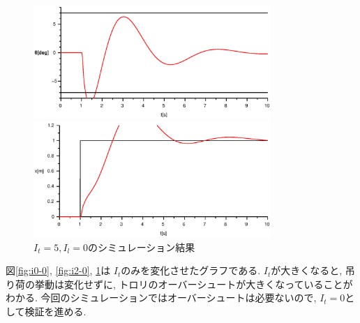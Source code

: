 \documentclass[titlepage]{jsarticle}
\begin{document}
            \begin{figure}[h]
                \begin{minipage}{0.5\hsize}
                    \centering
                    \includegraphics[width=9cm]{img/I5-0t.eps}
                \end{minipage}
                \begin{minipage}{0.5\hsize}
                    \centering
                    \includegraphics[width=9cm]{img/I5-0x.eps}
                \end{minipage}
                \caption{$I_t = 5, I_l = 0$のシミュレーション結果}
                \label{fig:i5-0}
            \end{figure}

            図\ref{fig:i0-0}, \ref{fig:i2-0}, \ref{fig:i5-0}は
            $I_t$のみを変化させたグラフである.
            $I_t$が大きくなると, 吊り荷の挙動は変化せずに,
            トロリのオーバーシュートが大きくなっていることがわかる.
            今回のシミュレーションではオーバーシュートは必要ないので,
            $I_t = 0$として検証を進める.
\end{document}
